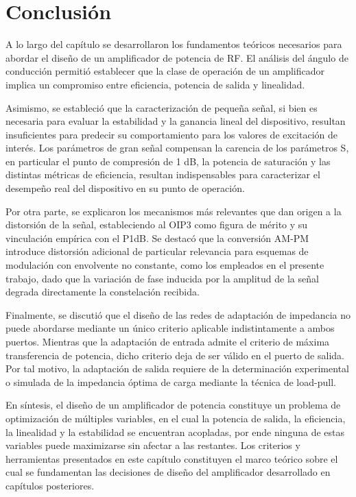 \section{Conclusión}
A lo largo del capítulo se desarrollaron los fundamentos teóricos necesarios para abordar el diseño de un amplificador de potencia de RF. El análisis del ángulo de conducción permitió establecer que la clase de operación de un amplificador implica un compromiso entre eficiencia, potencia de salida y linealidad. 

Asimismo, se estableció que la caracterización de pequeña señal, si bien es necesaria para evaluar la estabilidad y la ganancia lineal del dispositivo, resultan insuficientes para predecir su comportamiento para los valores de excitación de interés. Los parámetros de gran señal compensan la carencia de los parámetros S, en particular el punto de compresión de 1 dB, la potencia de saturación y las distintas métricas de eficiencia, resultan indispensables para caracterizar el desempeño real del dispositivo en su punto de operación.

Por otra parte, se explicaron los mecanismos más relevantes que dan origen a la distorsión de la señal, estableciendo al OIP3 como figura de mérito y su vinculación empírica con el P1dB. Se destacó que la conversión AM-PM introduce distorsión adicional de particular relevancia para esquemas de modulación con envolvente no constante, como los empleados en el presente trabajo, dado que la variación de fase inducida por la amplitud de la señal degrada directamente la constelación recibida.

Finalmente, se discutió que el diseño de las redes de adaptación de impedancia no puede abordarse mediante un único criterio aplicable indistintamente a ambos puertos. Mientras que la adaptación de entrada admite el criterio de máxima transferencia de potencia, dicho criterio deja de ser válido en el puerto de salida. Por tal motivo, la adaptación de salida requiere de la determinación experimental o simulada de la impedancia óptima de carga mediante la técnica de load-pull.

En síntesis, el diseño de un amplificador de potencia constituye un problema de optimización de múltiples variables, en el cual la potencia de salida, la eficiencia, la linealidad y la estabilidad se encuentran acopladas, por ende ninguna de estas variables puede maximizarse sin afectar a las restantes. Los criterios y herramientas presentados en este capítulo constituyen el marco teórico sobre el cual se fundamentan las decisiones de diseño del amplificador desarrollado en capítulos posteriores.